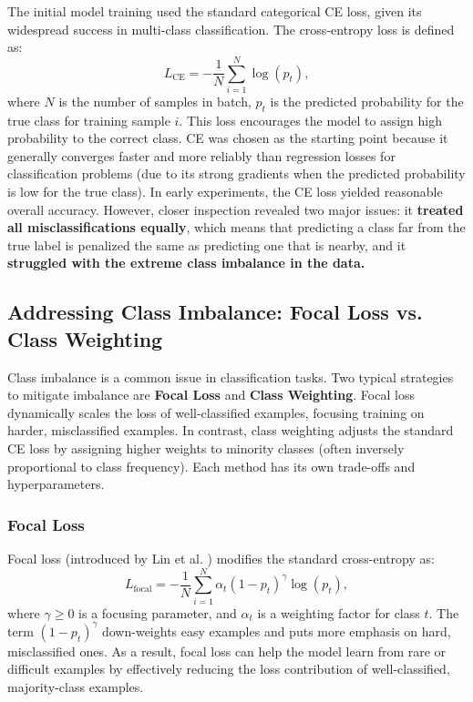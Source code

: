The initial model training used the standard categorical \ac{CE} loss, given its widespread success in multi-class classification. The cross-entropy loss is defined as:
\begin{equation}
    L_{\mathrm{CE}} = -\frac{1}{N} \sum_{i=1}^{N} \log(p_t),
\end{equation}
where $N$ is the number of samples in batch, $p_t$ is the predicted probability for the true class for training sample $i$. This loss encourages the model to assign high probability to the correct class. \ac{CE} was chosen as the starting point because it generally converges faster and more reliably than regression losses for classification problems (due to its strong gradients when the predicted probability is low for the true class).
In early experiments, the \ac{CE} loss yielded reasonable overall accuracy. However, closer inspection revealed two major issues: it \textbf{treated all misclassifications equally}, which means that predicting a class far from the true label is penalized the same as predicting one that is nearby, and it \textbf{struggled with the extreme class imbalance in the data.}

\subsection{Addressing Class Imbalance: Focal Loss vs. Class Weighting}
Class imbalance is a common issue in classification tasks. Two typical strategies to mitigate imbalance are \textbf{Focal Loss} and \textbf{Class Weighting}. Focal loss dynamically scales the loss of well-classified examples, focusing training on harder, misclassified examples. In contrast, class weighting adjusts the standard \ac{CE} loss by assigning higher weights to minority classes (often inversely proportional to class frequency). Each method has its own trade-offs and hyperparameters.

\subsubsection{Focal Loss}
Focal loss (introduced by Lin et al. \cite{lin2017focal}) modifies the standard cross-entropy as:
\[
L_{\text{focal}} = - \frac{1}{N} \sum_{i=1}^{N} \alpha_t (1 - p_t)^\gamma \log(p_t),
\]
where $\gamma \ge 0$ is a focusing parameter, and $\alpha_t$ is a weighting factor for class $t$. The term $(1 - p_t)^\gamma$ down-weights easy examples and puts more emphasis on hard, misclassified ones. As a result, focal loss can help the model learn from rare or difficult examples by effectively reducing the loss contribution of well-classified, majority-class examples.

